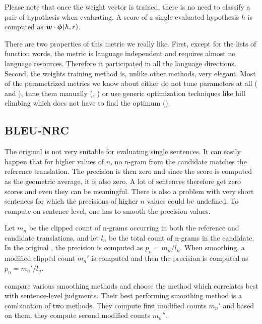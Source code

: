 Please note that once the weight vector is trained, there is no need to
classify a pair of hypothesis when evaluating. A score of a single evaluated hypothesis $h$
is computed as $\boldsymbol{w} \cdot \boldsymbol{\phi}(h,r)$.

There are two properties of this metric we really like. First, except for the
lists of function words, the metric is language independent and requires almost
no language resources. Therefore it participated in all the language
directions.  Second, the weights training method is, unlike other methods, very
elegant.  Most of the parametrized metrics we know about either do not tune
parameters at all ( and ), tune them manually
(, ) or use generic optimization techniques like
hill climbing which does not have to find the optimum ().

\subsection{BLEU-NRC}

The original  is not very suitable for evaluating single sentences. It
can easily happen that for higher values of $n$, no n-gram from the candidate
matches the reference translation. The precision is then zero and since
the  score is computed as the geometric average, it is also zero.
A lot of sentences therefore get zero scores and even they can be meaningful. There
is also a problem with very short sentences for which the precisions of higher
$n$ values could be undefined. To compute  on sentence level, one
has to smooth the precision values.

Let $m_n$ be the clipped count of n-grams occurring in both the reference and
candidate translations, and let $l_n$ be the total count of n-grams in the
candidate. In the original , the precision is computed as $p_n = m_n /
l_n$. When smoothing, a modified clipped count $m_n'$ is computed and then the
precision is computed as $p_n = m_n' / l_n$. 

 compare various smoothing methods and choose
the method which correlates best with sentence-level judgments. Their best
performing smoothing method is a combination of two methods. They compute first
modified counts $m_n'$ and based on them, they compute second modified counts
$m_n''$.

